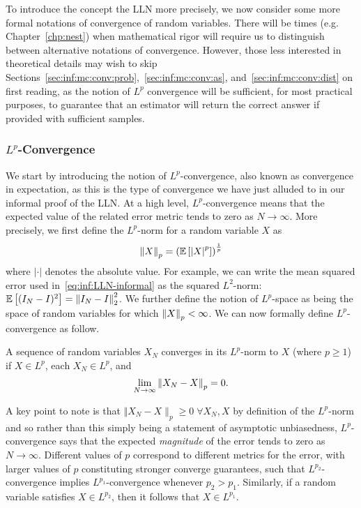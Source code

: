 To introduce the concept the LLN more precisely, we now consider some more formal notations
of convergence of random variables.  There will be times (e.g. Chapter~\ref{chp:nest})
when mathematical rigor will require us to distinguish between alternative notations of convergence.
However, those less interested in theoretical details may wish to
skip Sections~\ref{sec:inf:mc:conv:prob},~\ref{sec:inf:mc:conv:as}, and~\ref{sec:inf:mc:conv:dist}
on first reading, as the notion of $L^p$ convergence will be sufficient, for most practical purposes,
to guarantee that an estimator will return the correct answer if provided 
with sufficient samples. 

\subsubsection{$L^p$-Convergence}
\label{sec:inf:mc:conv:Lr}

We start by introducing the notion of $L^p$-convergence, also known as convergence in expectation,
as this is the type of convergence we have just alluded to in our informal proof of the LLN.
At a high level, $L^p$-convergence means that the expected value of the related error metric
tends to zero as $N\rightarrow \infty$.  More precisely, we first define the $L^p$-norm for
a random variable $X$ as
\begin{align}
\label{eq:inf:Lp-norm}
\left\lVert X\right\rVert_p = \left(\mathbb{E} \left[\left|X\right|^{p}\right]\right)^{\frac{1}{p}}
\end{align}
where $\left|\cdot\right|$ denotes the absolute value.  For example, we can write the
mean squared error used in~\eqref{eq:inf:LLN-informal} as the squared $L^2$-norm:
$\mathbb{E} \left[(I_N-I)^2\right] = \left\lVert I_N-I\right\rVert_2^2$.  We further define the notion of $L^p$-space
as being the space of random variables for which $\left\lVert X\right\rVert_p < \infty$.  We can now
formally define $L^p$-convergence as follow.
\begin{definition}[$L^p$-convergence]
A sequence of random variables $X_N$ converges in its $L^p$-norm to 
$X$ (where $p\ge1$) if $X\in L^p$, each $X_N \in L^p$, and
\begin{align}
\lim\limits_{N\rightarrow\infty} \left\lVert X_N-X\right\rVert_p=0. \label{eq:inf:Lp-conv-formal}
\end{align}
\end{definition}
\noindent A key point to note is that $\Vert X_N-X\rVert_p\ge0 \; \forall X_N, X$ by definition of the $L^p$-norm and so
rather than this simply being a statement of asymptotic unbiasedness, $L^p$-convergence says that the expected
\emph{magnitude} of the error tends to zero as $N\rightarrow\infty$.
Different values of $p$ correspond to different metrics for the error, with larger values of
$p$ constituting stronger converge guarantees, such that $L^{p_2}$-convergence implies
$L^{p_1}$-convergence whenever $p_2>p_1$.  Similarly, if a random variable satisfies
$X \in L^{p_2}$, then it follows that $X \in L^{p_1}$.

